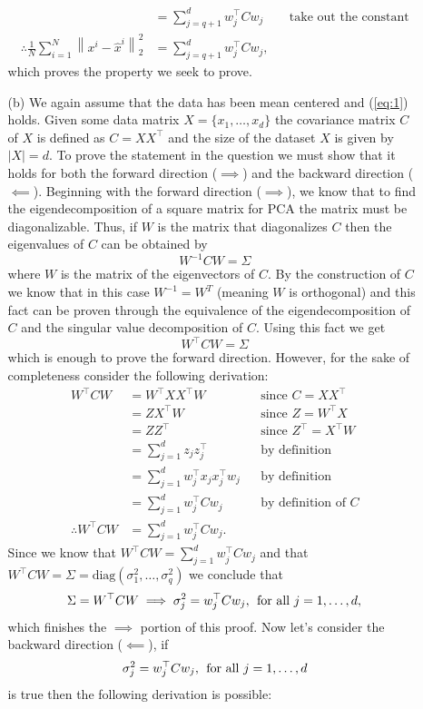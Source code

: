 \documentclass [10pt]{article}
\newcommand{\norm}[1]{\left\lVert#1\right\rVert}
\begin{document}
\begin{enumerate}
\begin{enumerate}
\begin{align}
			&=\sum_{j=q+1}^{d}w_{j}^{\top}Cw_{j}&&\text{take out the constant}\nonumber\\
			\therefore\frac{1}{N}\sum_{i=1}^{N}\norm{x^{i}-\hat{x}^{i}}_{2}^{2}&=\sum_{j=q+1}^{d}w_{j}^{\top}Cw_{j},\nonumber
		\end{align}
		which proves the property we seek to prove.
		\item[(b)]We again assume that the data has been mean centered and (\ref{eq:1}) holds. Given some data matrix $X=\{x_{1},\dots,x_{d}\}$ the covariance matrix $C$ of $X$ is defined as $C=XX^{\top}$ and the size of the dataset $X$ is given by $\left|X\right|=d$. To prove the statement in the question we must show that it holds for both the forward direction ($\implies$) and the backward direction ($\impliedby$). Beginning with the forward direction ($\implies$), we know that to find the eigendecomposition of a square matrix for PCA the matrix must be diagonalizable. Thus, if $W$ is the matrix that diagonalizes $C$ then the eigenvalues of $C$ can be obtained by$$W^{-1}CW=\Sigma$$where $W$ is the matrix of the eigenvectors of $C$. By the construction of $C$ we know that in this case $W^{-1}=W^{T}$ (meaning $W$ is orthogonal) and this fact can be proven through the equivalence of the eigendecomposition of $C$ and the singular value decomposition of $C$. Using this fact we get$$W^{\top}CW=\Sigma$$which is enough to prove the forward direction. However, for the sake of completeness consider the following derivation:
		\begin{align}
			W^{\top}CW&=W^{\top}XX^{\top}W&&\text{since $C=XX^{\top}$}\nonumber\\
			&=ZX^{\top}W&&\text{since $Z=W^{\top}X$}\nonumber\\
			&=ZZ^{\top}&&\text{since $Z^{\top}=X^{\top}W$}\nonumber\\
			&=\sum_{j=1}^{d}z_{j}z_{j}^{\top}&&\text{by definition}\nonumber\\
			&=\sum_{j=1}^{d}w_{j}^{\top}x_{j}x_{j}^{\top}w_{j}&&\text{by definition}\nonumber\\
			&=\sum_{j=1}^{d}w_{j}^{\top}Cw_{j}&&\text{by definition of $C$}\nonumber\\
			\therefore W^{\top}CW&=\sum_{j=1}^{d}w_{j}^{\top}Cw_{j}.\nonumber
		\end{align}
		Since we know that $W^{\top}CW=\sum_{j=1}^{d}w_{j}^{\top}Cw_{j}$ and that $W^{\top}CW=\Sigma=\text{diag}(\sigma_{1}^{2},\dots,\sigma_{q}^{2})$ we conclude that$$\Sigma=W^{\top}CW\implies \sigma_{j}^{2}=w_{j}^{\top}Cw_{j},\text{\:\:for all $j=1,\dots,d$},$$which finishes the $\implies$ portion of this proof. Now let's consider the backward direction ($\impliedby$), if$$\sigma_{j}^{2}=w_{j}^{\top}Cw_{j},\text{\:\:for all $j=1,\dots,d$}$$ is true then the following derivation is possible:

\end{enumerate}
\end{enumerate}
\end{document}
